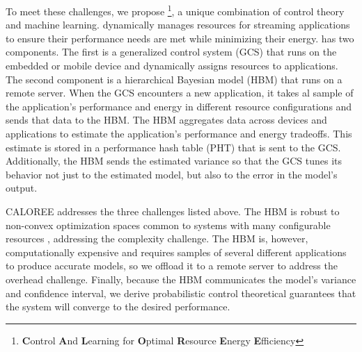 To meet these challenges, we propose
\SYSTEM{}\footnote{\textbf{C}ontrol \textbf{A}nd \textbf{L}earning for
  \textbf{O}ptimal \textbf{R}esource \textbf{E}nergy
  \textbf{E}fficiency}, a unique combination of control theory and
machine learning.  \SYSTEM{} dynamically manages resources for
streaming applications to ensure their performance needs are met while
minimizing their energy.  \SYSTEM{} has two components.  The first is
a generalized control system (GCS) that runs on the embedded or mobile
device and dynamically assigns resources to applications.  The second
component is a hierarchical Bayesian model (HBM) that runs on a remote
server.  When the GCS encounters a new application, it takes al sample
of the application's performance and energy in different resource
configurations and sends that data to the HBM.  The HBM aggregates
data across devices and applications to estimate the application's
performance and energy tradeoffs.  This estimate is stored in a
performance hash table (PHT) that is sent to the GCS.  Additionally,
the HBM sends the estimated variance so that the GCS tunes its
behavior not just to the estimated model, but also to the error in the
model's output.

CALOREE addresses the three challenges listed above.  The HBM is
robust to non-convex optimization spaces common to systems with many
configurable resources \cite{LEO}, addressing the complexity
challenge.  The HBM is, however, computationally expensive and
requires samples of several different applications to produce accurate
models, so we offload it to a remote server to address the overhead
challenge.  Finally, because the HBM communicates the model's variance
and confidence interval, we derive probabilistic control theoretical
guarantees that the system will converge to the desired performance.

